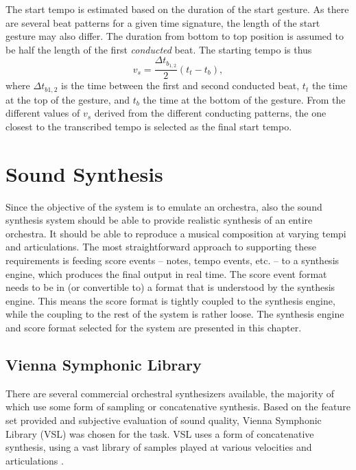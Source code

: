 The start tempo is estimated based on
the duration of the start gesture.
As there are several beat patterns for a given time signature,
the length of the start gesture may also differ.
The duration from bottom to top position is
assumed to be half the length of
the first \textit{conducted} beat.
The starting tempo is thus
\begin{equation}
v_s = \frac{\Delta t_{b_{1,2}}}{2} (t_t - t_b),
\end{equation}
where $\Delta t_{b1,2}$ is the
time between the first and second conducted beat,
$t_t$ the time at the top of the gesture,
and $t_b$ the time at the bottom of the gesture.
From the different values of $v_s$ derived from the
different conducting patterns,
the one closest to the transcribed tempo is selected
as the final start tempo.


\chapter{Sound Synthesis}
\label{chapter:sound_synthesis}

Since the objective of the system is to emulate an orchestra,
also the sound synthesis system should be able to
provide realistic synthesis of an entire orchestra.
It should be able to reproduce a musical composition
at varying tempi and articulations.
The most straightforward approach to supporting these requirements
is feeding score events --
notes, tempo events, etc. --
to a synthesis engine,
which produces the final output in real time.
The score event format needs to be in
(or convertible to)
a format that is understood by the synthesis engine.
This means the score format is tightly
coupled to the synthesis engine,
while the coupling to the rest of the system is rather loose.
The synthesis engine and score format selected for the system
are presented in this chapter.

\section{Vienna Symphonic Library}

There are several commercial orchestral synthesizers available,
the majority of which use some form of sampling or concatenative synthesis.
Based on the feature set provided and
subjective evaluation of sound quality,
Vienna Symphonic Library (VSL) \cite{vsl} was chosen for the task.
VSL uses a form of concatenative synthesis,
using a vast library of samples played at
various velocities and articulations \cite{schwartz2006}.

